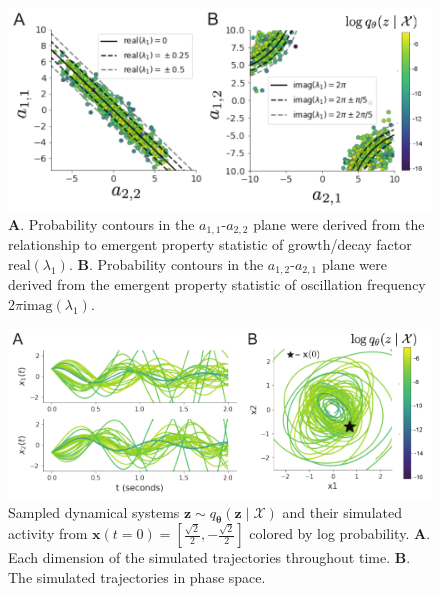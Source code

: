 \documentclass[11pt]{article}
\begin{document}
\begin{figure}
\begin{center}
\includegraphics[scale=0.8]{figures/figLDS2/figLDS2.pdf}
\end{center}
\caption{\textbf{A}. Probability contours in the $a_{1,1}$-$a_{2,2}$ plane were derived from the relationship to emergent property statistic of growth/decay factor $\text{real}(\lambda_1)$. 
\textbf{B}. Probability contours in the $a_{1,2}$-$a_{2,1}$ plane were derived from the emergent property statistic of oscillation frequency $2\pi \text{imag}(\lambda_1)$.}
\label{fig:LDS2}
\end{figure}

\begin{figure}
\begin{center}
\includegraphics[scale=0.8]{figures/figLDS3/figLDS3.pdf}
\end{center}
\caption{Sampled dynamical systems $\mathbf{z} \sim q_{\bm{\theta}}(\mathbf{z} \mid \mathcal{X})$ and their simulated activity from $\mathbf{x}(t=0) = [\frac{\sqrt{2}}{2}, -\frac{\sqrt{2}}{2}]$ colored by log probability. 
\textbf{A}. Each dimension of the simulated trajectories throughout time.  
\textbf{B}.  The simulated trajectories in phase space.}
\label{fig:LDS3}
\end{figure}
\end{document}
